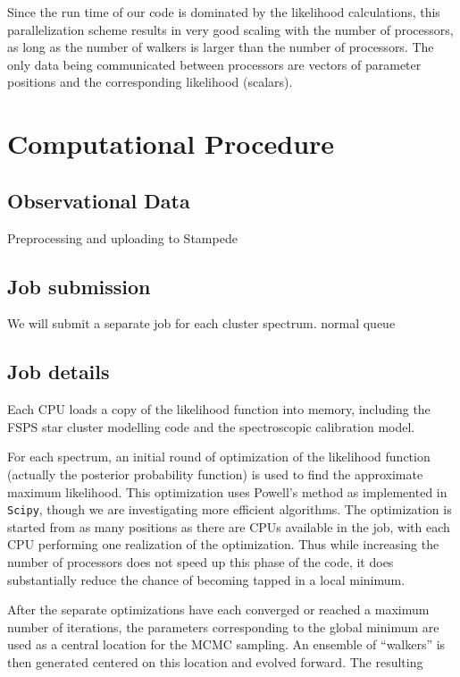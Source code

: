Since the run time of our code is dominated by the likelihood
calculations, this parallelization scheme results in very good scaling
with the number of processors, as long as the number of walkers is
larger than the number of processors.  The only data being
communicated between processors are vectors of parameter positions and
the corresponding likelihood (scalars).


\section{Computational Procedure}

\subsection{Observational Data}
Preprocessing and uploading to Stampede

\subsection{Job submission}
We will submit a separate job for each cluster spectrum. normal queue

\subsection{Job details}
Each CPU loads a copy of the likelihood function into memory,
including the FSPS star cluster modelling code and the spectroscopic
calibration model.

For each spectrum, an initial round of optimization of the likelihood
function (actually the posterior probability function) is used to find
the approximate maximum likelihood. This optimization uses Powell's
method as implemented in \texttt{Scipy}, though we are investigating
more efficient algorithms. The optimization is started from as many
positions as there are CPUs available in the job, with each CPU
performing one realization of the optimization.  Thus while increasing
the number of processors does not speed up this phase of the code, it
does substantially reduce the chance of becoming tapped in a local
minimum.

After the separate optimizations have each converged or reached a
maximum number of iterations, the parameters corresponding to the
global minimum are used as a central location for the MCMC sampling.
An ensemble of ``walkers'' is then generated centered on this location
and evolved forward.  The resulting 

